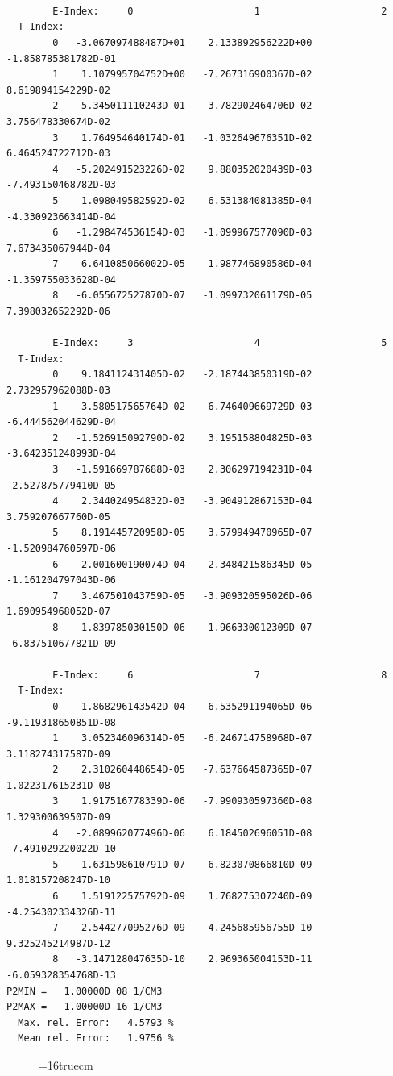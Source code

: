 \documentclass[12pt,dvipdfmx]{article}
\begin{document}
\begin{small}\begin{verbatim}



        E-Index:     0                     1                     2
  T-Index:
        0   -3.067097488487D+01    2.133892956222D+00   -1.858785381782D-01
        1    1.107995704752D+00   -7.267316900367D-02    8.619894154229D-02
        2   -5.345011110243D-01   -3.782902464706D-02    3.756478330674D-02
        3    1.764954640174D-01   -1.032649676351D-02    6.464524722712D-03
        4   -5.202491523226D-02    9.880352020439D-03   -7.493150468782D-03
        5    1.098049582592D-02    6.531384081385D-04   -4.330923663414D-04
        6   -1.298474536154D-03   -1.099967577090D-03    7.673435067944D-04
        7    6.641085066002D-05    1.987746890586D-04   -1.359755033628D-04
        8   -6.055672527870D-07   -1.099732061179D-05    7.398032652292D-06

        E-Index:     3                     4                     5
  T-Index:
        0    9.184112431405D-02   -2.187443850319D-02    2.732957962088D-03
        1   -3.580517565764D-02    6.746409669729D-03   -6.444562044629D-04
        2   -1.526915092790D-02    3.195158804825D-03   -3.642351248993D-04
        3   -1.591669787688D-03    2.306297194231D-04   -2.527875779410D-05
        4    2.344024954832D-03   -3.904912867153D-04    3.759207667760D-05
        5    8.191445720958D-05    3.579949470965D-07   -1.520984760597D-06
        6   -2.001600190074D-04    2.348421586345D-05   -1.161204797043D-06
        7    3.467501043759D-05   -3.909320595026D-06    1.690954968052D-07
        8   -1.839785030150D-06    1.966330012309D-07   -6.837510677821D-09

        E-Index:     6                     7                     8
  T-Index:
        0   -1.868296143542D-04    6.535291194065D-06   -9.119318650851D-08
        1    3.052346096314D-05   -6.246714758968D-07    3.118274317587D-09
        2    2.310260448654D-05   -7.637664587365D-07    1.022317615231D-08
        3    1.917516778339D-06   -7.990930597360D-08    1.329300639507D-09
        4   -2.089962077496D-06    6.184502696051D-08   -7.491029220022D-10
        5    1.631598610791D-07   -6.823070866810D-09    1.018157208247D-10
        6    1.519122575792D-09    1.768275307240D-09   -4.254302334326D-11
        7    2.544277095276D-09   -4.245685956755D-10    9.325245214987D-12
        8   -3.147128047635D-10    2.969365004153D-11   -6.059328354768D-13
P2MIN =   1.00000D 08 1/CM3
P2MAX =   1.00000D 16 1/CM3
  Max. rel. Error:   4.5793 %
  Mean rel. Error:   1.9756 %

\end{verbatim}\end{small}
\begin{figure} \label{7.2e}
\epsfxsize=16truecm
\end{figure}
\newpage
\end{document}
